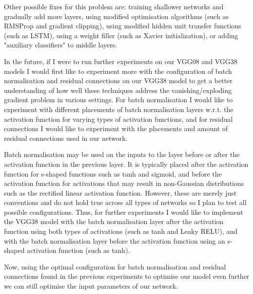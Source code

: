 {{%

Other possible fixes for this problem are: training shallower networks and gradually add more layers, using modified optimisation algorithms (such as RMSProp and gradient clipping), using modified hidden unit transfer functions (such as LSTM), using a weight filler (such as Xavier initialization), or adding "auxiliary classifiers" to middle layers.

In the future, if I were to run further experiments on our VGG08 and VGG38 models I would first like to experiment more with the configuration of batch normalisation and residual connections on our VGG38 model to get a better understanding of how well these techniques address the vanishing/exploding gradient problem in various settings. For batch normalisation I would like to experiment with different placements of batch normalisation layers w.r.t. the activation function for varying types of activation functions, and for residual connections I would like to experiment with the placements and amount of residual connections used in our network.

Batch normalisation may be used on the inputs to the layer before or after the activation function in the previous layer. It is typically placed after the activation function for s-shaped functions such as tanh and sigmoid, and before the activation function for activations that may result in non-Gaussian distributions such as the rectified linear activation function. However, these are merely just conventions and do not hold true across all types of networks so I plan to test all possible configurations. Thus, for further experiments I would like to implement the VGG38 model with the batch normalisation layer after the activation function using both types of activations (such as tanh and Leaky RELU), and with the batch normalisation layer before the activation function using an s-shaped activation function (such as tanh).


Now, using the optimal configuration for batch normalisation and residual connections found in the previous experiments to optimise our model even further we can still optimise the input parameters of our network.

}}
